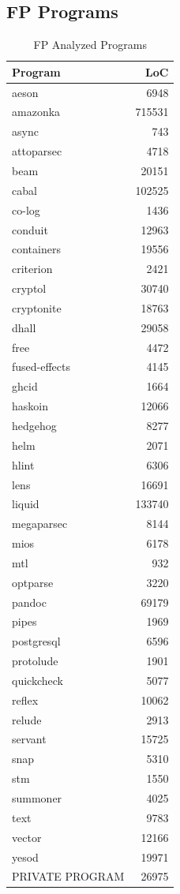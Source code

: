 \documentclass[12pt, a4paper]{article}
\begin{document}
\subsection{FP Programs}
\begin{longtable}[H]{l r}
    \caption{FP Analyzed Programs}\label{table:ax_fp_prog_1}\\
        Program & LoC \\
        \hline            
        \endhead
        aeson & 6948 \\
        amazonka & 715531 \\
        async & 743 \\
        attoparsec & 4718 \\
        beam & 20151 \\
        cabal & 102525 \\
        co-log & 1436 \\
        conduit & 12963 \\
        containers & 19556 \\
        criterion & 2421 \\
        cryptol & 30740 \\
        cryptonite & 18763 \\
        dhall & 29058 \\
        free & 4472 \\
        fused-effects & 4145 \\
        ghcid & 1664 \\
        haskoin & 12066 \\
        hedgehog & 8277 \\
        helm & 2071 \\
        hlint & 6306 \\
        lens & 16691 \\
        liquid & 133740 \\
        megaparsec & 8144 \\
        mios & 6178 \\
        mtl & 932 \\
        optparse & 3220 \\
        pandoc & 69179 \\
        pipes & 1969 \\
        postgresql & 6596 \\
        protolude & 1901 \\
        quickcheck & 5077 \\
        reflex & 10062 \\
        relude & 2913 \\
        servant & 15725 \\
        snap & 5310 \\
        stm & 1550 \\
        summoner & 4025 \\
        text & 9783 \\
        vector & 12166 \\
        yesod & 19971 \\
        PRIVATE PROGRAM & 26975
\end{longtable}
\end{document}
